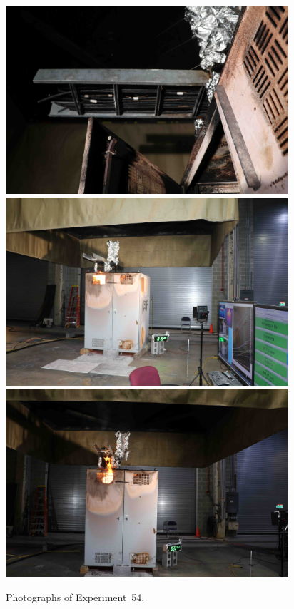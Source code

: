 \begin{figure}[p]
\centering
\includegraphics[height=2.75in]{../FIGURES/Test_54_cables} \\
\includegraphics[height=2.75in]{../FIGURES/Test_54_15_min_20_s} \\
\includegraphics[height=2.75in]{../FIGURES/Test_54_22_min_31_s}
\caption[Photographs of Experiment~54]{Photographs of Experiment~54.}
\label{fig:Test_54_photos}
\end{figure}


\clearpage

